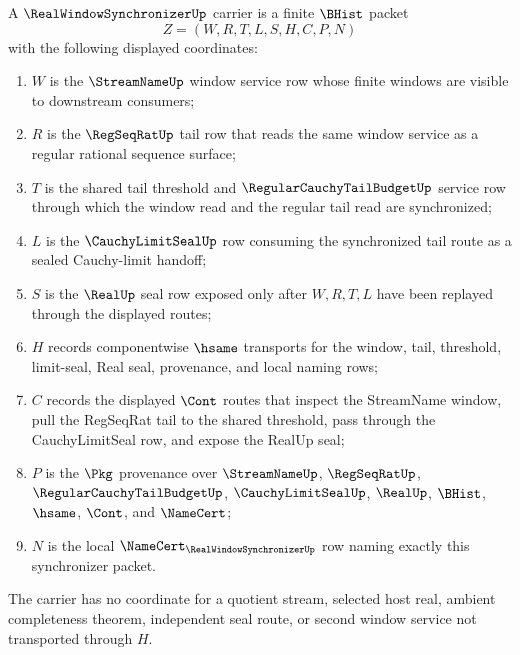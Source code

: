\begin{definition}
\label{def:real-window-synchronizer-carrier}
A $\RealWindowSynchronizerUp$ carrier is a finite $\BHist$ packet
$$
Z=(W,R,T,L,S,H,C,P,N)
$$
with the following displayed coordinates:
\begin{enumerate}
\item $W$ is the $\StreamNameUp$ window service row whose finite windows are visible to downstream consumers;
\item $R$ is the $\RegSeqRatUp$ tail row that reads the same window service as a regular rational sequence surface;
\item $T$ is the shared tail threshold and $\RegularCauchyTailBudgetUp$ service row through which the window read and the regular tail read are synchronized;
\item $L$ is the $\CauchyLimitSealUp$ row consuming the synchronized tail route as a sealed Cauchy-limit handoff;
\item $S$ is the $\RealUp$ seal row exposed only after $W,R,T,L$ have been replayed through the displayed routes;
\item $H$ records componentwise $\hsame$ transports for the window, tail, threshold, limit-seal, Real seal, provenance, and local naming rows;
\item $C$ records the displayed $\Cont$ routes that inspect the StreamName window, pull the RegSeqRat tail to the shared threshold, pass through the CauchyLimitSeal row, and expose the RealUp seal;
\item $P$ is the $\Pkg$ provenance over $\StreamNameUp$, $\RegSeqRatUp$, $\RegularCauchyTailBudgetUp$, $\CauchyLimitSealUp$, $\RealUp$, $\BHist$, $\hsame$, $\Cont$, and $\NameCert$;
\item $N$ is the local $\NameCert_{\RealWindowSynchronizerUp}$ row naming exactly this synchronizer packet.
\end{enumerate}
The carrier has no coordinate for a quotient stream, selected host real, ambient completeness theorem, independent seal route, or second window service not transported through $H$.
\end{definition}


